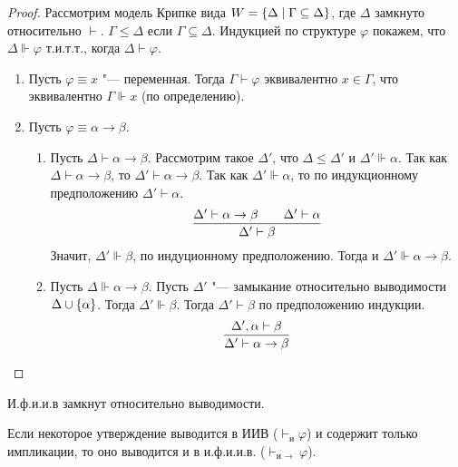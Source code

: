 \begin{proof}
    Рассмотрим модель Крипке вида $W = \left\{\Delta \mid \Gamma \subseteq \Delta\right\}$, где $\Delta$ замкнуто относительно $\vdash$.
    $\Gamma \leq \Delta$ если $\Gamma \subseteq \Delta$.
    Индукцией по структуре $\varphi$ покажем, что $\Delta \Vdash \varphi$ т.и.т.т., когда $\Delta \vdash \varphi$.
    \begin{enumerate}
        \item Пусть $\varphi \equiv x$ "--- переменная. Тогда $\Gamma \vdash \varphi$ эквивалентно $x \in \Gamma$, что эквивалентно $\Gamma\Vdash x$ (по определению).
        \item Пусть $\varphi \equiv \alpha \rightarrow \beta$.
        \begin{enumerate}[label=(\asbuk*)]
            \item Пусть $\Delta \vdash \alpha\rightarrow\beta$.
                Рассмотрим такое $\Delta'$, что $\Delta \leq \Delta'$ и $\Delta' \Vdash \alpha$.
                Так как $\Delta \vdash \alpha\rightarrow\beta$, то $\Delta' \vdash \alpha\rightarrow\beta$.
                Так как $\Delta' \Vdash \alpha$, то по индукционному предположению $\Delta' \vdash \alpha$.
                \[
                    \infer{\Delta' \vdash \beta}{\Delta' \vdash \alpha \rightarrow \beta && \Delta' \vdash \alpha}
                \]
                Значит, $\Delta' \Vdash \beta$, по индуционному предположению. Тогда и $\Delta' \Vdash \alpha\rightarrow\beta$.
            \item Пусть $\Delta \Vdash \alpha\rightarrow\beta$.
                Пусть $\Delta'$ "--- замыкание относительно выводимости $\Delta \cup \left\{\alpha\right\}$.
                Тогда $\Delta' \Vdash \beta$. Тогда $\Delta' \vdash \beta$ по предположению индукции.
                \[
                    \infer{\Delta' \vdash \alpha \rightarrow \beta}{\Delta', \alpha \vdash \beta} 
                    \qedhere
                \]
        \end{enumerate}
    \end{enumerate}
\end{proof}

\begin{corollary}
    И.ф.и.и.в замкнут относительно выводимости.
\end{corollary}
Если некоторое утверждение выводится в ИИВ ($\vdash_{и} \varphi$) и содержит только импликации,
то оно выводится и в и.ф.и.и.в. ($\vdash_{и \rightarrow} \varphi$).
